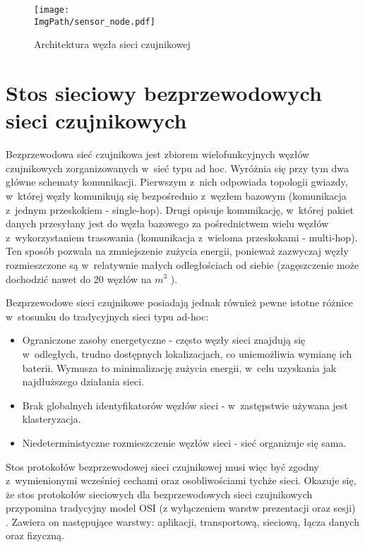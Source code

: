 \begin{figure}[H]
	\begin{center}
		\texttt{[image: \\ImgPath/sensor\_node.pdf]}
	\end{center}
	\caption{Architektura węzła sieci czujnikowej}
\end{figure}

\section{Stos sieciowy bezprzewodowych sieci czujnikowych}

Bezprzewodowa sieć czujnikowa jest zbiorem wielofunkcyjnych węzłów czujnikowych zorganizowanych w~sieć typu ad hoc. Wyróżnia się przy tym dwa główne schematy komunikacji. Pierwszym z~nich odpowiada topologii gwiazdy, w~której węzły komunikują się bezpośrednio z~węzłem bazowym (komunikacja z~jednym przeskokiem - single-hop). Drugi opisuje komunikację, w~której pakiet danych przesyłany jest do węzła bazowego za pośrednictwem wielu węzłów z~wykorzystaniem trasowania (komunikacja z~wieloma przeskokami - multi-hop). Ten sposób pozwala na zmniejszenie zużycia energii, ponieważ zazwyczaj węzły rozmieszczone są w~relatywnie małych odległościach od siebie (zagęszczenie może dochodzić nawet do 20 węzłów na $m^{3}$ \cite{Shih2001}).

Bezprzewodowe sieci czujnikowe posiadają jednak również pewne istotne różnice w~stosunku do tradycyjnych sieci typu ad-hoc:
\begin{itemize}
\item Ograniczone zasoby energetyczne - często węzły sieci znajdują się w~odległych, trudno dostępnych lokalizacjach, co uniemożliwia wymianę ich baterii. Wymusza to minimalizację zużycia energii, w~celu uzyskania jak najdłuższego działania sieci.
\item Brak globalnych identyfikatorów węzłów sieci - w~zastępstwie używana jest klasteryzacja.
\item Niedeterministyczne rozmieszczenie węzłów sieci - sieć organizuje się sama.
\end{itemize}

Stos protokołów bezprzewodowej sieci czujnikowej musi więc być zgodny z~wymienionymi wcześniej cechami oraz osobliwościami tychże sieci. Okazuje się, że  stos protokołów sieciowych dla bezprzewodowych sieci czujnikowych przypomina tradycyjny model OSI (z wyłączeniem warstw prezentacji oraz sesji) \cite{Akyildiz2002.09}. Zawiera on następujące warstwy: aplikacji, transportową, sieciową, łącza danych oraz fizyczną.

